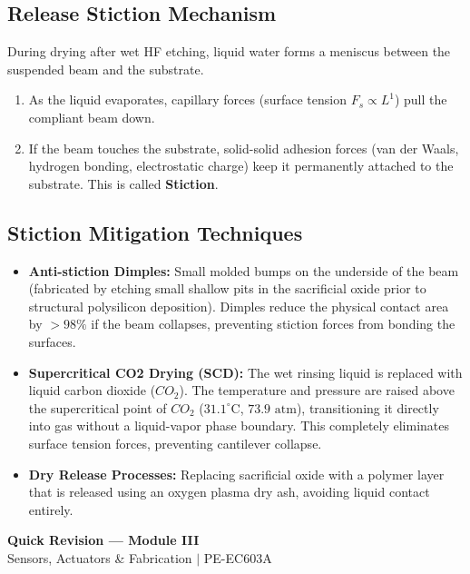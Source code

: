 \documentclass[12pt,a4paper]{article}
\begin{document}
\subsection{Release Stiction Mechanism}
During drying after wet HF etching, liquid water forms a meniscus between the suspended beam and the substrate.
\begin{enumerate}[leftmargin=*, label=\arabic*.]
  \item As the liquid evaporates, capillary forces (surface tension $F_s \propto L^1$) pull the compliant beam down.
  \item If the beam touches the substrate, solid-solid adhesion forces (van der Waals, hydrogen bonding, electrostatic charge) keep it permanently attached to the substrate. This is called \textbf{Stiction}.
\end{enumerate}

\subsection{Stiction Mitigation Techniques}
\begin{itemize}[leftmargin=*, itemsep=4pt]
  \item \textbf{Anti-stiction Dimples:} Small molded bumps on the underside of the beam (fabricated by etching small shallow pits in the sacrificial oxide prior to structural polysilicon deposition). Dimples reduce the physical contact area by $>98\%$ if the beam collapses, preventing stiction forces from bonding the surfaces.
  \item \textbf{Supercritical CO2 Drying (SCD):} The wet rinsing liquid is replaced with liquid carbon dioxide ($CO_2$). The temperature and pressure are raised above the supercritical point of $CO_2$ ($31.1^{\circ}\text{C}$, $73.9\text{ atm}$), transitioning it directly into gas without a liquid-vapor phase boundary. This completely eliminates surface tension forces, preventing cantilever collapse.
  \item \textbf{Dry Release Processes:} Replacing sacrificial oxide with a polymer layer that is released using an oxygen plasma dry ash, avoiding liquid contact entirely.
\end{itemize}

\newpage
\begin{center}
  {\large\bfseries\color{myred} Quick Revision --- Module III}\\[3pt]
  {\small\color{mydark} Sensors, Actuators \& Fabrication $|$ PE-EC603A}
\end{center}
\noindent{\color{myred}\rule{\linewidth}{1.2pt}}
\vspace{4pt}
\end{document}
